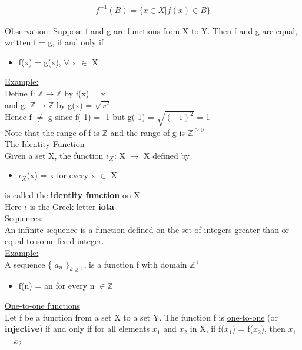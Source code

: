 \documentclass{article}
\begin{document}
\begin{align}
f^{-1}(B) = \{ x \in X | f(x) \in B \}
\end{align}

Observation: Suppose f and g are functions from X to Y. Then f and g are equal, written f = g, if and only if
\begin{itemize}
\item f(x) = g(x), $\forall$ x $\in$ X
\end{itemize} 

\underline{Example:}\\
Define f: $\mathbb{Z} \longrightarrow \mathbb{Z}$ by f(x) = x \\
and g: $\mathbb{Z} \longrightarrow \mathbb{Z}$ by g(x) = $\sqrt{x^{2}}$ \\

Hence f $\neq$ g since f(-1) = -1 but g(-1) = $\sqrt{(-1)^{2}}$ = 1  \\

Note that the range of f is $\mathbb{Z}$ and the range of g is $\mathbb{Z}^{\geq 0}$ \\

\underline{The Identity Function} \\
Given a set X, the function $\iota_{X}$: X $\longrightarrow$ X defined by
\begin{itemize}
\item $\iota_{X}$(x) = x for every x $\in$ X 
\end{itemize}
is called the \textbf{identity function} on X \\

Here $\iota$ is the Greek letter \textbf{iota} \\

\underline{Sequences:} \\
An infinite sequence is a function defined on the set of integers greater than or equal to some fixed integer. \\

\underline{Example:} \\
A sequence \{ $a_{n}$ $\}_{k \geq 1}$, is a function f with domain $\mathbb{Z}^{+}$
\begin{itemize}
\item f(n) = an for every n $\in \mathbb{Z}^{+}$
\end{itemize}

\underline{One-to-one functions}\\
Let f be a function from a set X to a set Y. The function f is \underline{one-to-one} (or \textbf{injective}) if and only if for all elements $x_{1}$ and $x_{2}$ in X, if f($x_{1}$) = f($x_{2}$), then $x_{1}$ = $x_{2}$ \\
\end{document}

